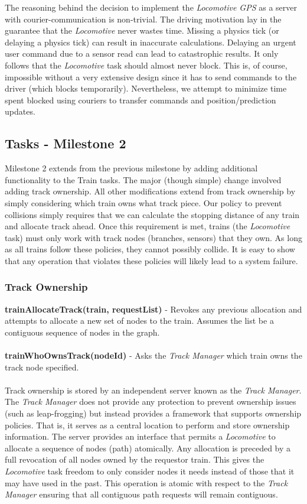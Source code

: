 \documentclass[twoside,a4paper]{refart}
\begin{document}
The reasoning behind the decision to implement the \textit{Locomotive GPS} as a server with courier-communication is non-trivial. The driving motivation lay in the guarantee that the \textit{Locomotive} never wastes time. Missing a physics tick (or delaying a physics tick) can result in inaccurate calculations. Delaying an urgent user command due to a sensor read can lead to catastrophic results. It only follows that the \textit{Locomotive} task should almost never block. This is, of course, impossible without a very extensive design since it has to send commands to the driver (which blocks temporarily). Nevertheless, we attempt to minimize time spent blocked using couriers to transfer commands and position/prediction updates.

\subsection{Tasks - Milestone 2}
Milestone 2 extends from the previous milestone by adding additional functionality to the Train tasks. The major (though simple) change involved adding track ownership. All other modifications extend from track ownership by simply considering which train owns what track piece. Our policy to prevent collisions simply requires that we can calculate the stopping distance of any train and allocate track ahead. Once this requirement is met, trains (the \textit{Locomotive} task) must only work with track nodes (branches, sensors) that they own. As long as all trains follow these policies, they cannot possibly collide. It is easy to show that any operation that violates these policies will likely lead to a system failure.

\subsubsection{Track Ownership}

\textbf{trainAllocateTrack(train, requestList)} - Revokes any previous allocation and attempts to allocate a new set of nodes to the train. Assumes the list be a contiguous sequence of nodes in the graph. \\\\
\textbf{trainWhoOwnsTrack(nodeId)} - Asks the \textit{Track Manager} which train owns the track node specified. \\\\

Track ownership is stored by an independent server known as the \textit{Track Manager}. The \textit{Track Manager} does not provide any protection to prevent ownership issues (such as leap-frogging) but instead provides a framework that supports ownership policies. That is, it serves as a central location to perform and store ownership information. The server provides an interface that permits a \textit{Locomotive} to allocate a sequence of nodes (path) atomically. Any allocation is preceded by a full revocation of all nodes owned by the requestor train. This gives the \textit{Locomotive} task freedom to only consider nodes it needs instead of those that it may have used in the past. This operation is atomic with respect to the \textit{Track Manager} ensuring that all contiguous path requests will remain contiguous.
\end{document}
